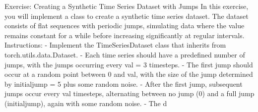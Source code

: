 \documentclass[../labs.tex]{subfiles}
\begin{document}


\noindent Exercise: Creating a Synthetic Time Series Dataset with Jumps In this exercise, you will implement a class to create a synthetic time series dataset. The dataset consists of flat sequences with periodic jumps, simulating data where the value remains constant for a while before increasing significantly at regular intervals. Instructions: - Implement the TimeSeriesDataset class that inherits from torch.utils.data.Dataset. - Each time series should have a predefined number of jumps, with the jumps occurring every val = 3 timesteps. - The first jump should occur at a random point between 0 and val, with the size of the jump determined by initialjump = 5 plus some random noise. - After the first jump, subsequent jumps occur every val timesteps, alternating between no jump (0) and a full jump (initialjump), again with some random noise. - The d
\end{document}
